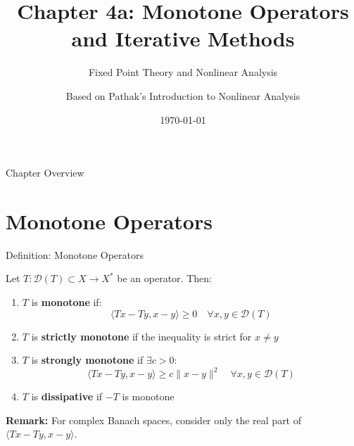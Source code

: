 \documentclass[aspectratio=169,10pt]{beamer}
\title{Chapter 4a: Monotone Operators and Iterative Methods}
\subtitle{Fixed Point Theory and Nonlinear Analysis}
\author{Based on Pathak's Introduction to Nonlinear Analysis}
\date{\today}
\begin{document}
\frame{\titlepage}


\begin{frame}{Chapter Overview}
\tableofcontents
\end{frame}


\section{Monotone Operators}

\begin{frame}[fragile]{Definition: Monotone Operators}

\begin{definition}
Let $T : \mathcal{D}(T) \subset X \to X^*$ be an operator. Then:

\begin{enumerate}
\item[(i)] $T$ is \textbf{monotone} if:
$$\langle Tx - Ty, x - y \rangle \geq 0 \quad \forall x, y \in \mathcal{D}(T)$$

\item[(ii)] $T$ is \textbf{strictly monotone} if the inequality is strict for $x \neq y$

\item[(iii)] $T$ is \textbf{strongly monotone} if $\exists c > 0$:
$$\langle Tx - Ty, x - y \rangle \geq c \|x - y\|^2 \quad \forall x, y \in \mathcal{D}(T)$$

\item[(iv)] $T$ is \textbf{dissipative} if $-T$ is monotone
\end{enumerate}
\end{definition}

\vspace{0.3cm}

\textbf{Remark:} For complex Banach spaces, consider only the real part of $\langle Tx - Ty, x - y \rangle$.

\end{frame}
\end{document}
